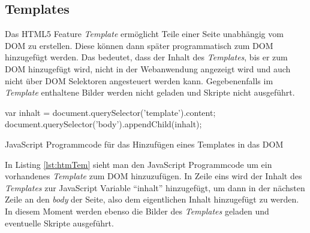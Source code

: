 \documentclass[12pt, paper=a4, bibtotoc, toc=listof, headsepline=true]{scrreprt}
\begin{document}
		\subsection{Templates}
		\label{subsec:Templates}
		Das \ac{HTML5} Feature \emph{Template} ermöglicht Teile einer Seite unabhängig vom \ac{DOM} zu erstellen. Diese können dann später programmatisch zum \ac{DOM} hinzugefügt werden\cite[S.177]{Cameron2015}. Das bedeutet, dass der Inhalt des \emph{Templates}, bis er zum \ac{DOM} hinzugefügt wird, nicht in der Webanwendung angezeigt wird und auch nicht über \ac{DOM} Selektoren angesteuert werden kann. Gegebenenfalls im \emph{Template} enthaltene Bilder werden nicht geladen und Skripte nicht ausgeführt\cite{Potschien2013}.
		\begin{listing}
			\begin{JavaScriptcode*}{}
var inhalt = document.querySelector('template').content;
document.querySelector('body').appendChild(inhalt);
			\end{JavaScriptcode*}
			\caption[Hinzufügen eines Templates]{JavaScript Programmcode für das Hinzufügen eines Templates in das DOM}
			\label{lst:htmTem}
		\end{listing}
		In Listing \ref{lst:htmTem} sieht man den JavaScript Programmcode um ein vorhandenes \emph{Template} zum \ac{DOM} hinzuzufügen. In Zeile eins wird der Inhalt des \emph{Templates} zur JavaScript Variable \enquote{inhalt} hinzugefügt, um dann in der nächsten Zeile an den \emph{body} der Seite, also dem eigentlichen Inhalt hinzugefügt zu werden. In diesem Moment werden ebenso die Bilder des \emph{Templates} geladen und eventuelle Skripte ausgeführt.
\end{document}
